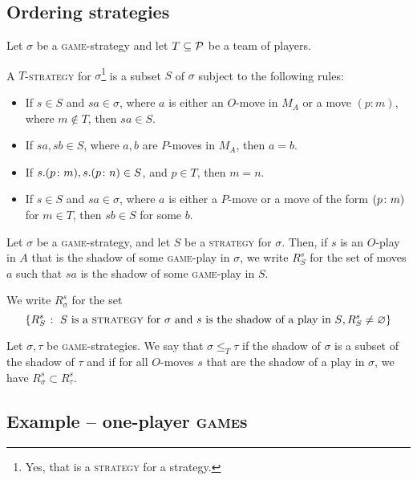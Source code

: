 \documentclass{article}
\newcommand{\game}{\textsc{game}}
\newcommand{\strategy}{\textsc{strategy}}
\begin{document}
\subsection{Ordering strategies}

\begin{definition}
  Let $\sigma$ be a \game{}-strategy and let $T\subset \P$ be a team of players.

  A $T$-\strategy{} for $\sigma$\footnote{Yes, that is a \strategy{} for a strategy.} is a subset $S$ of $\sigma$ subject to the following rules:
  \begin{itemize}
    \item If $s\in S$ and $sa\in\sigma$, where $a$ is either an $O$-move in $M_A$ or a move $(p:m)$, where $m\not\in T$, then $sa\in S$.
    \item If $sa,sb\in S$, where $a,b$ are $P$-moves in $M_A$, then $a=b$.
    \item If $s.(p\from m),s.(p\from n)\in S$, and $p\in T$, then $m=n$.
    \item If $s\in S$ and $sa\in\sigma$, where $a$ is either a $P$-move or a move of the form $(p\from m)$ for $m\in T$, then $sb\in S$ for some $b$.
  \end{itemize}
\end{definition}

\begin{definition}
  Let $\sigma$ be a \game{}-strategy, and let $S$ be a \strategy{} for $\sigma$.  
  Then, if $s$ is an $O$-play in $A$ that is the shadow of some \game{}-play in $\sigma$, we write $R_S^s$ for the set of moves $a$ such that $sa$ is the shadow of some \game{}-play in $S$.

  We write $R_\sigma^s$ for the set
  \[
    \{R_S^s\suchthat \textrm{$S$ is a \strategy{} for $\sigma$ and $s$ is the shadow of a play in $S$}, R_S^s\ne\emptyset\}
    \]
\end{definition}

\begin{definition}
  Let $\sigma,\tau$ be \game{}-strategies.  
  We say that $\sigma \le_T \tau$ if the shadow of $\sigma$ is a subset of the shadow of $\tau$ and if for all $O$-moves $s$ that are the shadow of a play in $\sigma$, we have $R_\sigma^s\subset R_\tau^s$.
\end{definition}

\subsection{Example -- one-player \game{}s}
\end{document}
